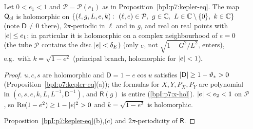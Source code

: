 \begin{proposition}[Orbit maps near $e=0$]\label{bpI:p7:orbit-maps-e}
Let $0<e_1<1$ and $\mathcal P=\mathcal P(e_1)$ as in Proposition~\ref{bpI:p7:kepler-eq}. The map $\mathsf Q_{\rm el}$ is holomorphic on
$\{(\ell,g,L,e,k):\ (\ell,e)\in\mathcal P,\ g\in\C,\ L\in\C\setminus\{0\},\ k\in\C\}$ (note $\mathsf D\ne0$ there), $2\pi$-periodic in $\ell$ and in $g$, and real on real points with $\lvert e\rvert\le e_1$; in particular it is holomorphic on a complex neighbourhood of $e=0$ (the tube $\mathcal P$ contains the disc $\lvert e\rvert<\delta_E$) (only $e$, not $\sqrt{1-G^2/L^2}$, enters), e.g.\ with $k=\sqrt{1-e^2}$ (principal branch, holomorphic for $\lvert e\rvert<1$).
\end{proposition}
\begin{proof}
\label{stepI:p7:om-hol} $u,c,s$ are holomorphic and $\mathsf D=1-e\cos u$ satisfies $\lvert \mathsf D\rvert\ge1-\vartheta_*>0$ (Proposition~\ref{bpI:p7:kepler-eq}(a)); the formulas for $X,Y,P_X,P_Y$ are polynomial in $(c,s,e,k,L,L^{-1},\mathsf D^{-1})$, and $\mathsf R(g)$ is entire (\ref{bpI:p7:x-hol}). $\lvert e\rvert<e_2<1$ on $\mathcal P$, so $\operatorname{Re}(1-e^2)\ge1-\lvert e\rvert^2>0$ and $k=\sqrt{1-e^2}$ is holomorphic.

\label{stepI:p7:om-per} Proposition~\ref{bpI:p7:kepler-eq}(b),(c) and $2\pi$-periodicity of $\mathsf R$.
\end{proof}

